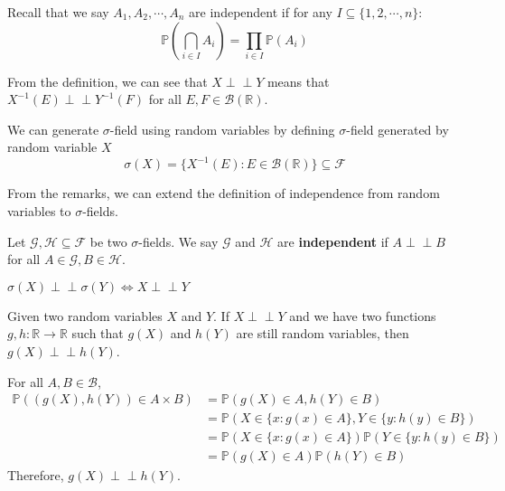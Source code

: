 \documentclass{huhtakm-template-book}
\newcommand{\independent}{\perp\!\!\!\perp}
\newcommand{\prob}{\mathbb{P}}
\begin{document}
    Recall that we say $A_{1},A_{2},\cdots,A_{n}$ are independent if for any $I\subseteq\{1,2,\cdots,n\}$:
    \begin{equation*}
        \prob\left(\bigcap_{i\in I}A_{i}\right)=\prod_{i\in I}\prob(A_{i})
    \end{equation*}
    \begin{rem}
        From the definition, we can see that $X\independent Y$ means that $X^{-1}(E)\independent Y^{-1}(F)$ for all $E,F\in\mathcal{B}(\mathbb{R})$.
    \end{rem}
    \begin{rem}
        We can generate $\sigma$-field using random variables by defining $\sigma$-field generated by random variable $X$
        \begin{equation*}
        	\sigma(X)=\{X^{-1}(E):E\in\mathcal{B}(\mathbb{R})\}\subseteq\mathcal{F}
        \end{equation*}
    \end{rem}
    From the remarks, we can extend the definition of independence from random variables to $\sigma$-fields.
    \begin{defn}
        Let $\mathcal{G},\mathcal{H}\subseteq\mathcal{F}$ be two $\sigma$-fields. We say $\mathcal{G}$ and $\mathcal{H}$ are \textbf{independent} if $A\independent B$ for all $A\in\mathcal{G},B\in\mathcal{H}$.
    \end{defn}
    \begin{rem}
        $\sigma(X)\independent\sigma(Y)\iff X\independent Y$
    \end{rem}
    \begin{thm}
        Given two random variables $X$ and $Y$. If $X\independent Y$ and we have two functions $g,h:\mathbb{R}\to\mathbb{R}$ such that $g(X)$ and $h(Y)$ are still random variables, then $g(X)\independent h(Y)$.
    \end{thm}
    \begin{proofing}
        For all $A,B\in\mathcal{B}$,
        \begin{align*}
            \prob((g(X),h(Y))\in A\times B)&=\prob(g(X)\in A,h(Y)\in B)\\
            &=\prob(X\in\{x:g(x)\in A\},Y\in\{y:h(y)\in B\})\\
            &=\prob(X\in\{x:g(x)\in A\})\prob(Y\in\{y:h(y)\in B\})\\
            &=\prob(g(X)\in A)\prob(h(Y)\in B)
        \end{align*}
        Therefore, $g(X)\independent h(Y)$.
    \end{proofing}
\end{document}
